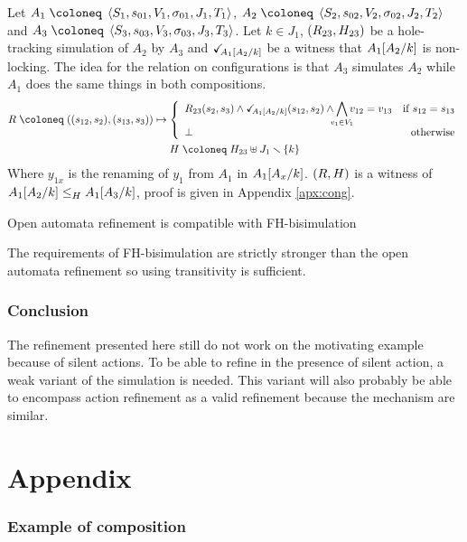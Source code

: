 \documentclass{article}
\begin{document}
Let \(A_1 \defobject \OAg[1]\), \(A_2 \defobject \OAg[2]\) and \(A_3 \defobject \OAg[3]\).
Let \(k \in J_1\), \(\mpar{R_{23}, H_{23}}\) be a hole-tracking simulation of \(A_2\) by \(A_3\) and \(\reach{A_1\subst{A_2}{k}}\) be a witness that \(A_1\subst{A_2}{k}\) is non-locking.
The idea for the relation on configurations is that \(A_3\) simulates \(A_2\) while \(A_1\) does the same things in both compositions.
\begin{gather*}
	R \defobject \mpar{\mpar{s_{12}, s_2}, \mpar{s_{13}, s_3}} \mapsto \choice{R_{23}\mpar{s_2, s_3} \wedge \reach{A_1\subst{A_2}{k}}\mpar{s_{12}, s_2} \wedge \bigwedge_\subbox{v_1 \in V_1} v_{12} = v_{13} & \text{if } s_{12} = s_{13} \\ \bot & \text{otherwise}} \\
	H \defobject H_{23} \uplus J_1 \setminus \mbrc{k}
\end{gather*}
Where \(y_{1x}\) is the renaming of \(y_1\) from \(A_1\) in \(A_1\subst{A_x}{k}\).
\(\mpar{R, H}\) is a witness of \(\wrel{A_1\subst{A_2}{k}}{A_1\subst{A_3}{k}}{H}\), proof is given in Appendix \ref{apx:cong}.
\begin{thm} Open automata refinement is compatible with FH-bisimulation \end{thm}
The requirements of FH-bisimulation are strictly stronger than the open automata refinement so using transitivity is sufficient.


\section{Conclusion}\label{sec:ccl}

The refinement presented here still do not work on the motivating example because of silent actions.
To be able to refine in the presence of silent action, a weak variant of the simulation is needed.
This variant will also probably be able to encompass action refinement as a valid refinement because the mechanism are similar.


\pagebreak



\pagebreak
\appendix
\part*{Appendix}

\section{Example of composition}
\end{document}
